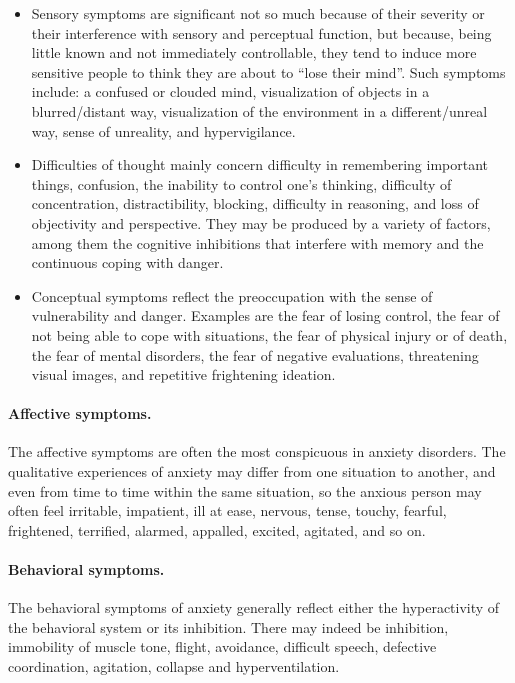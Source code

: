 \begin{itemize}[leftmargin=2em]
  \item Sensory symptoms are significant not so much because of their
        severity or their interference with sensory and perceptual function, but
        because, being little known and not immediately controllable, they tend
        to induce more sensitive people to think they are about to ``lose their
        mind''. Such symptoms include: a confused or clouded mind, visualization
        of objects in a blurred/distant way, visualization of the environment in
        a different/unreal way, sense of unreality, and hypervigilance.
  \item Difficulties of thought mainly concern difficulty in
        remembering important things, confusion, the inability to control one's
        thinking, difficulty of concentration, distractibility, blocking,
        difficulty in reasoning, and loss of objectivity and perspective. They
        may be produced by a variety of factors, among them the cognitive
        inhibitions that interfere with memory and the continuous coping with
        danger.
  \item Conceptual symptoms reflect the preoccupation with the sense of
        vulnerability and danger. Examples are the fear of losing control, the
        fear of not being able to cope with situations, the fear of physical
        injury or of death, the fear of mental disorders, the fear of negative
        evaluations, threatening visual images, and repetitive frightening
        ideation.
\end{itemize}

\paragraph{Affective symptoms.}
The affective symptoms are often the most conspicuous in anxiety disorders. The
qualitative experiences of anxiety may differ from one situation to another, and
even from time to time within the same situation, so the anxious person may often
feel irritable, impatient, ill at ease, nervous, tense, touchy, fearful,
frightened, terrified, alarmed, appalled, excited, agitated, and so on.

\paragraph{Behavioral symptoms.}
The behavioral symptoms of anxiety generally reflect either the hyperactivity of
the behavioral system or its inhibition. There may indeed be inhibition,
immobility of muscle tone, flight, avoidance, difficult speech, defective
coordination, agitation, collapse and hyperventilation.

